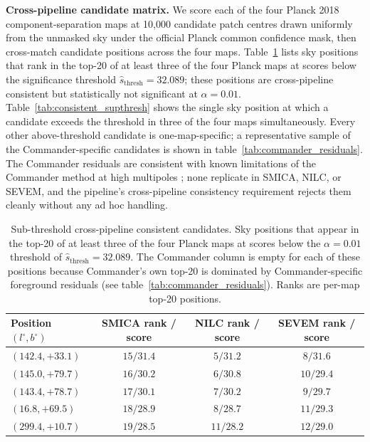 \documentclass[a4paper,11pt]{article}
\begin{document}
\textbf{Cross-pipeline candidate matrix.} We score each of the four Planck 2018 component-separation maps at 10{,}000 candidate patch centres drawn uniformly from the unmasked sky under the official Planck common confidence mask, then cross-match candidate positions across the four maps. Table~\ref{tab:consistent_subthresh} lists sky positions that rank in the top-20 of at least three of the four Planck maps at scores below the significance threshold $\hat{s}_{\text{thresh}} = 32.089$; these positions are cross-pipeline consistent but statistically not significant at $\alpha = 0.01$. Table~\ref{tab:consistent_supthresh} shows the single sky position at which a candidate exceeds the threshold in three of the four maps simultaneously. Every other above-threshold candidate is one-map-specific; a representative sample of the Commander-specific candidates is shown in table~\ref{tab:commander_residuals}. The Commander residuals are consistent with known limitations of the Commander method at high multipoles \citep{planck2018_iv}; none replicate in SMICA, NILC, or SEVEM, and the pipeline's cross-pipeline consistency requirement rejects them cleanly without any ad hoc handling.

\begin{table}[t]
\centering
\caption{Sub-threshold cross-pipeline consistent candidates. Sky positions that appear in the top-20 of at least three of the four Planck maps at scores below the $\alpha = 0.01$ threshold of $\hat{s}_{\text{thresh}} = 32.089$. The Commander column is empty for each of these positions because Commander's own top-20 is dominated by Commander-specific foreground residuals (see table~\ref{tab:commander_residuals}). Ranks are per-map top-20 positions.}
\label{tab:consistent_subthresh}
\begin{tabular}{lccc}
\toprule
Position $(l^\circ, b^\circ)$ & SMICA rank / score & NILC rank / score & SEVEM rank / score \\
\midrule
$(142.4, +33.1)$ & $15 / 31.4$ & $5 / 31.2$ & $8 / 31.6$ \\
$(145.0, +79.7)$ & $16 / 30.2$ & $6 / 30.8$ & $10 / 29.4$ \\
$(143.4, +78.7)$ & $17 / 30.1$ & $7 / 30.2$ & $9 / 29.7$ \\
$(16.8, +69.5)$  & $18 / 28.9$ & $8 / 28.7$ & $11 / 29.3$ \\
$(299.4, +10.7)$ & $19 / 28.5$ & $11 / 28.2$ & $12 / 29.0$ \\
\bottomrule
\end{tabular}
\end{table}
\end{document}
